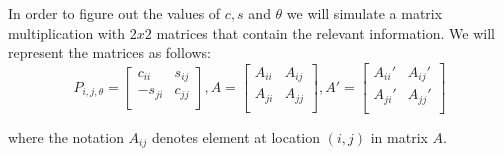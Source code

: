 \documentclass[12pt,twoside]{article}
\begin{document}
In order to figure out the values of $c,s$ and $\theta$ we will simulate a matrix multiplication with $2x2$ matrices that contain the relevant information. We will represent the matrices as follows:
\begin{equation}
P_{i,j,\theta} = 
\begin{bmatrix}
     c_{ii} & s_{ij} \\
    -s_{ji} & c_{jj} \\
\end{bmatrix}
,A = 
\begin{bmatrix}
     A_{ii} & A_{ij} \\
    A_{ji} & A_{jj} \\
\end{bmatrix}
,A' = 
\begin{bmatrix}
     A_{ii}' & A_{ij}' \\
    A_{ji}' & A_{jj}' \\
\end{bmatrix}
\end{equation}

where the notation $A_{ij}$ denotes element at location $(i,j)$ in matrix $A$.\\
\end{document}
